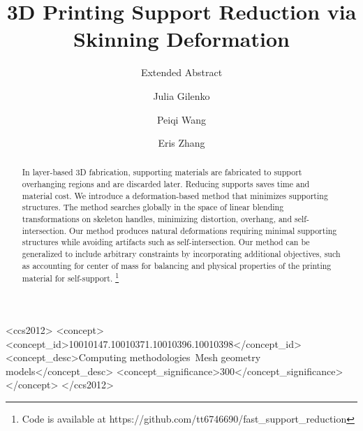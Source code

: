 \documentclass[sigconf]{acmart}
\begin{document}
\title{3D Printing Support Reduction via Skinning Deformation}
\subtitle{Extended Abstract}

\author{Julia Gilenko}

\author{Peiqi Wang}

\author{Eris Zhang}

\renewcommand{\shortauthors}{Julia G. Mark W. Eris Z.}

\begin{abstract}
 
In layer-based 3D fabrication, supporting materials are fabricated to support overhanging regions and are discarded later. Reducing supports saves time and material cost. We introduce a deformation-based method that minimizes supporting structures. The method searches globally in the space of linear blending transformations on skeleton handles, minimizing distortion, overhang, and self-intersection. Our method produces natural deformations requiring minimal supporting structures while avoiding artifacts such as self-intersection. Our method can be generalized to include arbitrary constraints by incorporating additional objectives, such as accounting for center of mass for balancing and physical properties of the printing material for self-support. \footnote{Code is available at https://github.com/tt6746690/fast\_support\_reduction}
\end{abstract}

%
%
\begin{CCSXML}
    <ccs2012>
    <concept>
    <concept_id>10010147.10010371.10010396.10010398</concept_id>
    <concept_desc>Computing methodologies~Mesh geometry models</concept_desc>
    <concept_significance>300</concept_significance>
    </concept>
    </ccs2012>
\end{CCSXML}


\end{document}
